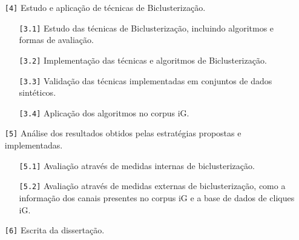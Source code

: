 \documentclass[normaltoc, espacoumemeio, pnumromarab,ruledheader]{abnt}
\begin{document}
\begin{enumerate}
\begin{enumerate}
  \end{enumerate}
  \item[{\texttt{[4]}}] Estudo e aplicação de técnicas de Biclusterização.
  \begin{enumerate}
    \item[{\texttt{[3.1]}}] Estudo das técnicas de Biclusterização, incluindo algoritmos e formas de avaliação.
    \item[{\texttt{[3.2]}}] Implementação das técnicas e algoritmos de Biclusterização.
    \item[{\texttt{[3.3]}}] Validação das técnicas implementadas em conjuntos de dados sintéticos.
    \item[{\texttt{[3.4]}}] Aplicação dos algoritmos no corpus iG.
  \end{enumerate}
  \item[{\texttt{[5]}}] Análise dos resultados obtidos pelas estratégias propostas e implementadas.
  \begin{enumerate}
    \item[{\texttt{[5.1]}}] Avaliação através de medidas internas de biclusterização.
    \item[{\texttt{[5.2]}}] Avaliação através de medidas externas de biclusterização, como a informação dos canais presentes no corpus iG e a base de dados de cliques iG.
  \end{enumerate}
  \item[{\texttt{[6]}}] Escrita da dissertação.
\end{enumerate}

    

%


\end{document}
